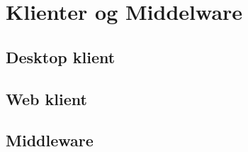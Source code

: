 
\chapter{Klienter og Middelware}\label{ch:clientMiddleware}


\section{Desktop klient}\label{sec:desktopClient}


\section{Web klient}\label{sec:webClient}


\section{Middleware}\label{sec:middleware}